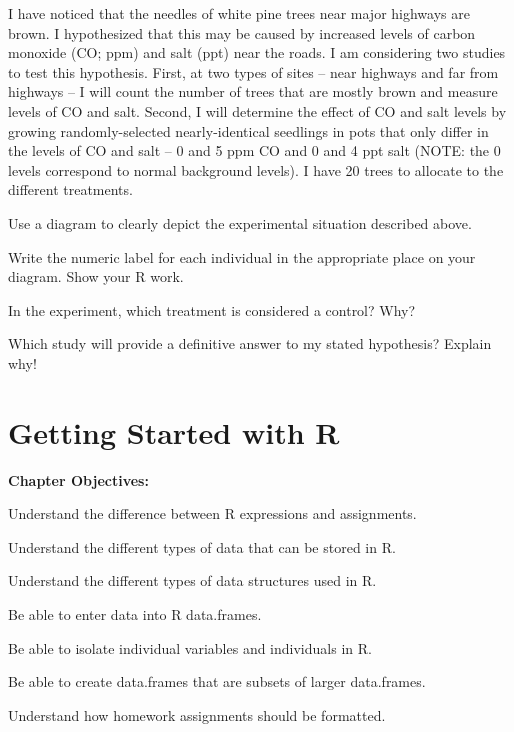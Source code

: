 \documentclass[10pt,openany]{book}\usepackage[]{graphicx}\usepackage[]{color}
\begin{document}
\begin{exsection}
  \item \label{revex:ExpDPine} I have noticed that the needles of white pine trees near major highways are brown.  I hypothesized that this may be caused by increased levels of carbon monoxide (CO; ppm) and salt (ppt) near the roads.  I am considering two studies to test this hypothesis.  First, at two types of sites -- near highways and far from highways -- I will count the number of trees that are mostly brown and measure levels of CO and salt.  Second, I will determine the effect of CO and salt levels by growing randomly-selected nearly-identical seedlings in pots that only differ in the levels of CO and salt -- 0 and 5 ppm CO and 0 and 4 ppt salt (NOTE: the 0 levels correspond to normal background levels).  I have 20 trees to allocate to the different treatments. 
\begin{Enumerate}
  \item Use a diagram to clearly depict the experimental situation described above.
  \item \rhw{} Write the numeric label for each individual in the appropriate place on your diagram.  Show your R work.
  \item In the experiment, which treatment is considered a control?  Why?
  \item Which study will provide a definitive answer to my stated hypothesis?  Explain why!
\end{Enumerate}

\end{exsection}



\chapter{Getting Started with R} \label{chap:FoundationsR}
\begin{ChapObj}{\boxwidth}
  \textbf{Chapter Objectives:}
  \begin{Enumerate}
    \item Understand the difference between R expressions and assignments.
    \item Understand the different types of data that can be stored in R.
    \item Understand the different types of data structures used in R.
    \item Be able to enter data into R data.frames.
    \item Be able to isolate individual variables and individuals in R.
    \item Be able to create data.frames that are subsets of larger data.frames.
    \item Understand how homework assignments should be formatted.
  \end{Enumerate}
\end{ChapObj}
\end{document}
